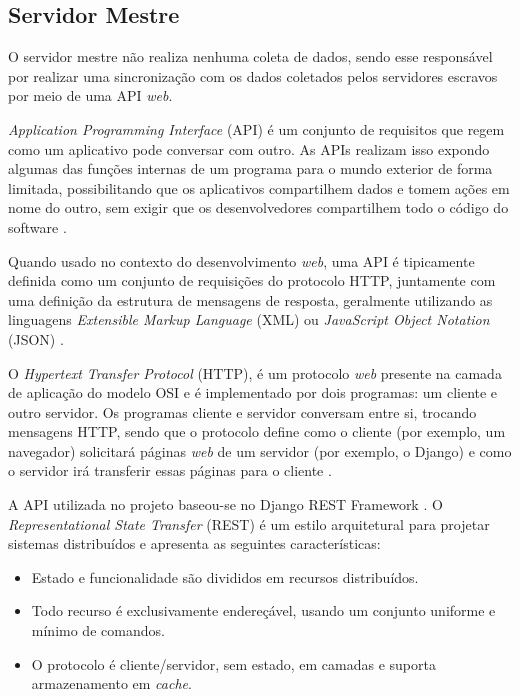\subsection{Servidor Mestre}
O servidor mestre não realiza nenhuma coleta de dados, sendo esse responsável por realizar uma sincronização com os dados coletados pelos servidores escravos por meio de uma API \textit{web}.

\textit{Application Programming Interface} (API) é um conjunto de requisitos que regem como um aplicativo pode conversar com outro. As APIs realizam isso expondo algumas das funções internas de um programa para o mundo exterior de forma limitada, possibilitando que os aplicativos compartilhem dados e tomem ações em nome do outro, sem exigir que os desenvolvedores compartilhem todo o código do software \cite{brian_api}.

Quando usado no contexto do desenvolvimento \textit{web}, uma API é tipicamente definida como um conjunto de requisições do protocolo HTTP, juntamente com uma definição da estrutura de mensagens de resposta, geralmente utilizando as linguagens \textit{Extensible Markup Language} (XML) ou \textit{JavaScript Object Notation} (JSON) \cite{benslimane_2008}.

O \textit{Hypertext Transfer Protocol} (HTTP), é um protocolo \textit{web} presente na camada de aplicação do modelo OSI e é implementado por dois programas: um cliente e outro servidor. Os programas cliente e servidor conversam entre si, trocando mensagens HTTP, sendo que o protocolo define como o cliente (por exemplo, um navegador) solicitará páginas \textit{web} de um servidor (por exemplo, o Django) e como o servidor irá transferir essas páginas para o cliente \cite{kurose_2002}.

A API utilizada no projeto baseou-se no Django REST Framework \cite{django_rest}. O \textit{Representational State Transfer} (REST) \cite{fielding_2000} é um estilo arquitetural para projetar sistemas distribuídos e apresenta as seguintes características:

\begin{itemize}
    \item Estado e funcionalidade são divididos em recursos distribuídos.
    \item Todo recurso é exclusivamente endereçável, usando um conjunto uniforme e mínimo de comandos.
    \item O protocolo é cliente/servidor, sem estado, em camadas e suporta armazenamento em \textit{cache}.
\end{itemize}

